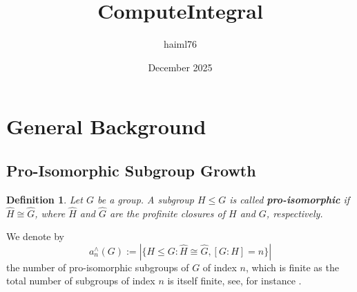 \documentclass{article}
\title{ComputeIntegral}
\author{haiml76 }
\date{December 2025}
\newtheorem{definition}[theorem]{Definition}
\begin{document}
\maketitle
\section{General Background}
\subsection{Pro-Isomorphic Subgroup Growth}
\begin{definition}
\label{def:pro.isomorphic}
Let $G$ be a group. A subgroup $H\leq G$ is called \textbf{pro-isomorphic} if $\widehat{H}\cong\widehat{G}$, where $\widehat{H}$ and $\widehat{G}$ are the profinite closures of $H$ and $G$, respectively.
\end{definition}
We denote by \[a_{n}^{\wedge}(G):=|\{H\leq G : \widehat{H}\cong\widehat{G}, [G:H]=n\}|\]
the number of pro-isomorphic subgroups of $G$ of index $n$, which is finite as the total number of subgroups of index $n$ is itself finite, see, for instance \cite[Corollary 1.1.2]{LubotzkySegal}.
\end{document}
